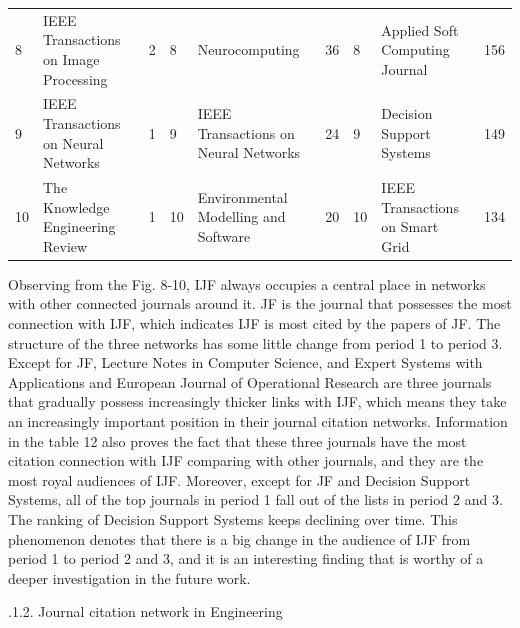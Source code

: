 \documentclass[11pt,a4paper]{elsarticle} %
\begin{document}
\begin{landscape}
\begin{table}[!htbp]
{\begin{tabular}{p{1.5cm}<{\centering} p{6cm}<{\centering} p{1.5cm}<{\centering}|p{1.5cm}<{\centering} p{6cm}<{\centering} p{1.5cm}<{\centering}|p{1.5cm}<{\centering} p{6cm}<{\centering} p{1.5cm}<{\centering}}
   8 & IEEE Transactions on Image Processing & 2 & 8 & Neurocomputing & 36 & 8 & Applied Soft Computing Journal & 156\\
   9 & IEEE Transactions on Neural Networks & 1 & 9 & IEEE Transactions on Neural Networks & 24 & 9 & Decision Support Systems & 149\\
   10 & The Knowledge Engineering Review & 1 & 10 & Environmental Modelling and Software & 20 & 10 & IEEE Transactions on Smart Grid & 134\\
  \hline
  \hline
    \end{tabular}}
\end{table}
\end{landscape}

Observing from the Fig. 8-10, IJF always occupies a central place in
networks with other connected journals around it. JF is the journal that
possesses the most connection with IJF, which indicates IJF is most
cited by the papers of JF. The structure of the three networks has some
little change from period 1 to period 3. Except for JF, Lecture Notes in
Computer Science, and Expert Systems with Applications and European
Journal of Operational Research are three journals that gradually
possess increasingly thicker links with IJF, which means they take an
increasingly important position in their journal citation networks.
Information in the table 12 also proves the fact that these three
journals have the most citation connection with IJF comparing with other
journals, and they are the most royal audiences of IJF. Moreover, except
for JF and Decision Support Systems, all of the top journals in period 1
fall out of the lists in period 2 and 3. The ranking of Decision Support
Systems keeps declining over time. This phenomenon denotes that there is
a big change in the audience of IJF from period 1 to period 2 and 3, and
it is an interesting finding that is worthy of a deeper investigation in
the future work.

.1.2. Journal citation network in Engineering
\end{document}
